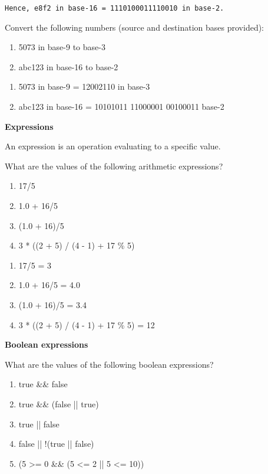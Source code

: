 \begin{questions}
\begin{verbatim}
Hence, e8f2 in base-16 = 1110100011110010 in base-2.
\end{verbatim}

Convert the following numbers (source and destination bases provided):

\begin{enumerate}
\item 5073 in base-9 to base-3
\item abc123 in base-16 to base-2
\end{enumerate}

\begin{solution}
\begin{enumerate}
\item 5073 in base-9 = 12002110 in base-3
\item abc123 in base-16 = 10101011 11000001 00100011 base-2
\end{enumerate}
\end{solution}

\question \textbf{Expressions}
\vskip 0.5cm

An expression is an operation evaluating to a specific value.

What are the values of the following arithmetic expressions?

\begin{enumerate}
\item 17/5
\item 1.0 + 16/5
\item (1.0 + 16)/5
\item 3 * ((2 + 5) / (4 - 1) + 17 \% 5)
\end{enumerate}

\begin{solution}
\begin{enumerate}
\item 17/5 = 3
\item 1.0 + 16/5 = 4.0
\item (1.0 + 16)/5 = 3.4
\item 3 * ((2 + 5) / (4 - 1) + 17 \% 5) = 12
\end{enumerate}	
\end{solution}

\question \textbf{Boolean expressions}
\vskip 0.5cm

What are the values of the following boolean expressions?

\begin{enumerate}
\item true \&\& false
\item true \&\& (false || true)
\item true || false
\item false || !(true || false)
\item (5 >= 0 \&\& (5 <= 2 || 5 <= 10))
\end{enumerate}


\end{questions}
